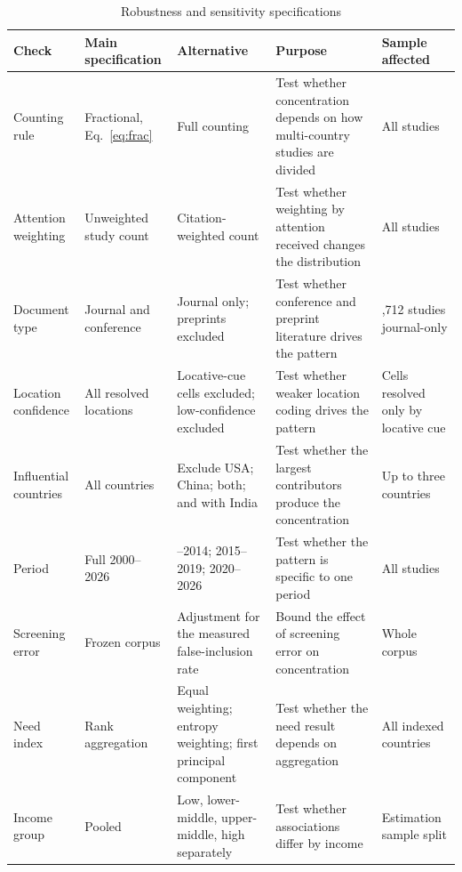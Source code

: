 \documentclass[ASNA,twocolumn]{USG}
\begin{document}
\begin{table}[t]
\centering
\scriptsize
\setlength{\tabcolsep}{3.5pt}
\renewcommand{\arraystretch}{1.1}
\caption{Robustness and sensitivity specifications}
\label{tab:specs}
\begin{tabular}{@{}>{\raggedright\arraybackslash}p{2.9cm}
                  >{\raggedright\arraybackslash}p{2.6cm}
                  >{\raggedright\arraybackslash}p{3.0cm}
                  >{\raggedright\arraybackslash}p{3.1cm}
                  >{\raggedright\arraybackslash}p{2.3cm}@{}}
\toprule
Check & Main specification & Alternative & Purpose & Sample affected \\
\midrule
Counting rule & Fractional, Eq.~\eqref{eq:frac} & Full counting &
Test whether concentration depends on how multi-country studies are divided & All studies \\
\addlinespace
Attention weighting & Unweighted study count & Citation-weighted count &
Test whether weighting by attention received changes the distribution & All studies \\
\addlinespace
Document type & Journal and conference & Journal only; preprints excluded &
Test whether conference and preprint literature drives the pattern & 1,712 studies journal-only \\
\addlinespace
Location confidence & All resolved locations & Locative-cue cells excluded; low-confidence excluded &
Test whether weaker location coding drives the pattern & Cells resolved only by locative cue \\
\addlinespace
Influential countries & All countries & Exclude USA; China; both; and with India &
Test whether the largest contributors produce the concentration & Up to three countries \\
\addlinespace
Period & Full 2000--2026 & 2000--2014; 2015--2019; 2020--2026 &
Test whether the pattern is specific to one period & All studies \\
\addlinespace
Screening error & Frozen corpus & Adjustment for the measured false-inclusion rate &
Bound the effect of screening error on concentration & Whole corpus \\
\addlinespace
Need index & Rank aggregation & Equal weighting; entropy weighting; first principal component &
Test whether the need result depends on aggregation & All indexed countries \\
\addlinespace
Income group & Pooled & Low, lower-middle, upper-middle, high separately &
Test whether associations differ by income & Estimation sample split \\

\end{tabular}
\end{table}
\end{document}
